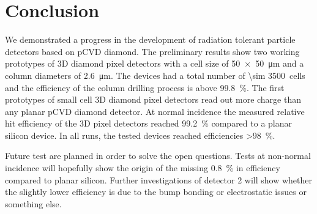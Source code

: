 \section{Conclusion}
We demonstrated a progress in the development of radiation tolerant particle detectors based on \ac{pCVD} diamond. The preliminary results show two working prototypes of 3D diamond pixel detectors with a cell size of \SI{50x50}{\um} and a column diameters of \SI{2.6}{\um}. The devices had a total number of \SI{\sim 3500}{cells} and the efficiency of the column drilling process is above \SI{99.8}{\%}. The first prototypes of small cell 3D diamond pixel detectors read out more charge than any planar \ac{pCVD} diamond detector. At normal incidence the measured relative hit efficiency of the 3D pixel detectors reached \SI{99.2}{\%} compared to a planar silicon device. In all runs, the tested devices reached efficiencies \SI{>98}{\%}.\par
Future test are planned in order to solve the open questions. Tests at non-normal incidence will hopefully show the origin of the missing \SI{.8}{\%} in efficiency compared to planar silicon. Further investigations of detector 2 will show whether the slightly lower efficiency is due to the bump bonding or electrostatic issues or something else.